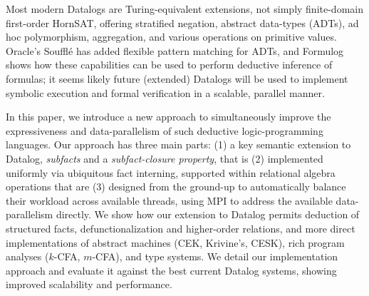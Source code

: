 Most modern Datalogs are Turing-equivalent extensions, not simply finite-domain first-order HornSAT, offering stratified negation, abstract data-types (ADTs), ad hoc polymorphism, aggregation, and various operations on primitive values.
Oracle's Souffl\'e has added flexible pattern matching for ADTs, and Formulog~\cite{formulog-bembenek2020} shows how these capabilities can be used to perform deductive inference of formulas; it seems likely future (extended) Datalogs will be used to implement symbolic execution and formal verification in a scalable, parallel manner.    

In this paper, we introduce a new approach to simultaneously improve the expressiveness and data-parallelism of such deductive logic-programming languages. Our approach has three main parts: (1) a key semantic extension to Datalog, \emph{subfacts} and a \emph{subfact-closure property}, that is (2) implemented uniformly via ubiquitous fact interning, supported within relational algebra operations that are (3) designed from the ground-up to automatically balance their workload across available threads, using MPI to address the available data-parallelism directly. We show how our extension to Datalog permits deduction of structured facts, defunctionalization and higher-order relations, and more direct implementations of abstract machines (CEK, Krivine's, CESK), rich program analyses ($k$-CFA, $m$-CFA), and type systems. We detail our implementation approach and evaluate it against the best current Datalog systems, showing improved scalability and performance.

